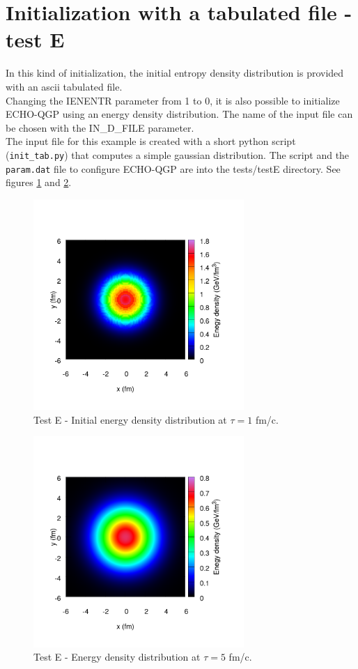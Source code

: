 \section{Initialization with a tabulated file - test E}
In this kind of initialization, the initial entropy density distribution is provided with an ascii tabulated file.\\
Changing the IENENTR parameter from 1 to 0, it is also possible to initialize ECHO-QGP using an energy density distribution. The name of the input file can be chosen with the IN\_D\_FILE parameter.\\
The input file for this example is created with a short python script ({\tt init\_tab.py}) that computes a simple gaussian distribution. The script and the {\tt param.dat} file to configure ECHO-QGP are into the tests/testE directory. See figures \ref{fig:testE1} and \ref{fig:testE2}.\\
\begin{figure}[!h]
 \begin{center}
  \includegraphics[width=8cm]{images/contour_energy_density_tau1.png}
   \caption{Test E - Initial energy density distribution at $\tau=1$ fm/c.}
    \label{fig:testE1}
 \end{center}
\end{figure}
\begin{figure}[!h]
 \begin{center}
  \includegraphics[width=8cm]{images/contour_energy_density_tau5.png}
   \caption{Test E - Energy density distribution at $\tau=5$ fm/c.}
    \label{fig:testE2}
 \end{center}
\end{figure}

